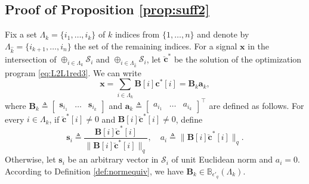 \documentclass[10pt,twocolumn,twoside] {IEEEtran}
\begin{document}
{\subsection{Proof of Proposition \ref{prop:suff2}}
\label{app:propsuff2}
\noindent Fix a set $\Lambda_k = \{i_1,\ldots,i_k\}$ of $k$ indices from $\{1, \ldots, n\}$ and denote by $\Lambda_{\widehat{k}} = \{i_{k+1},\ldots,i_n\}$ the set of the remaining indices. For a signal ${{\mathbf x}}$ in the intersection of $\oplus_{i \in \Lambda_k} \mathcal{S}_i$ and $\oplus_{i \in \Lambda_{\widehat{k}}} \mathcal{S}_i$, let $\breve{\boldsymbol{c}}^*$ be the solution of the optimization program \eqref{eq:L2L1red3}. We can write 
\begin{equation}
\label{eq:op1p}
{{\mathbf x}} = \sum_{i \in \Lambda_k} {\boldsymbol{B}}[i] {\boldsymbol{c}}^*[i] = {\boldsymbol{B}}_k {\boldsymbol{a}}_k,
\end{equation}
where ${\boldsymbol{B}}_k \triangleq \begin{bmatrix} {\boldsymbol{s}}_{i_1} \!\!& \ldots \!\!& {\boldsymbol{s}}_{i_k} \end{bmatrix}$ and ${\boldsymbol{a}}_k \triangleq \begin{bmatrix} a_{i_1} \!\!& \ldots \!\!& a_{i_k} \end{bmatrix}^{\top}$ are defined as follows. For every $i \in \Lambda_k$, if $\breve{\boldsymbol{c}}^*[i] \neq 0$ and ${\boldsymbol{B}}[i] \breve{\boldsymbol{c}}^*[i] \neq 0$, define 
\begin{equation}
{\boldsymbol{s}}_i \triangleq \frac{{\boldsymbol{B}}[i] \breve{\boldsymbol{c}}^*[i]}{ \| {\boldsymbol{B}}[i]  \breve{\boldsymbol{c}}^*[i] \|_q }, \quad a_i \triangleq \| {\boldsymbol{B}}[i] \breve{\boldsymbol{c}}^*[i] \|_q. 
\end{equation}
Otherwise, let ${\boldsymbol{s}}_i$ be an arbitrary vector in $\mathcal{S}_i$ of unit Euclidean norm and $a_i = 0$. According to Definition \ref{def:normequiv}, we have ${\boldsymbol{B}}_k \in \mathbb{B}_{\epsilon'_q}(\Lambda_k)$.

}
\end{document}
